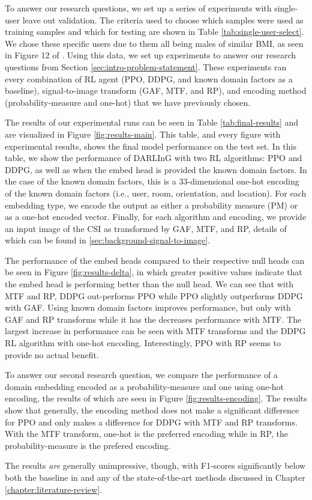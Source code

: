 To answer our research questions, we set up a series of experiments with single-user leave out validation.
The criteria used to choose which samples were used as training samples and which for testing are shown in Table \ref{tab:single-user-select}.
We chose these specific users due to them all being males of similar BMI, as seen in Figure 12 of \cite{zheng2019zero}.
Using this data, we set up experiments to answer our research questions from Section \ref{sec:intro-problem-statement}.
These experiments ran every combination of RL agent (PPO, DDPG, and known domain factors as a baseline), signal-to-image transform (GAF, MTF, and RP), and encoding method (probability-measure and one-hot) that we have previously chosen.

The results of our experimental runs can be seen in Table \ref{tab:final-results} and are visualized in Figure \ref{fig:results-main}.
This table, and every figure with experimental results, shows the final model performance on the test set.
In this table, we show the performance of DARLInG with two RL algorithms: PPO and DDPG, as well as when the embed head is provided the known domain factors.
In the case of the known domain factors, this is a 33-dimensional one-hot encoding of the known domain factors (i.e., user, room, orientation, and location).
For each embedding type, we encode the output as either a probability measure (PM) or as a one-hot encoded vector.
Finally, for each algorithm and encoding, we provide an input image of the CSI as transformed by GAF, MTF, and RP, details of which can be found in \ref{sec:background-signal-to-image}.

The performance of the embed heads compared to their respective null heads can be seen in Figure \ref{fig:results-delta}, in which greater positive values indicate that the embed head is performing better than the null head.
We can see that with MTF and RP, DDPG out-performs PPO while PPO slightly outperforms DDPG with GAF.
Using known domain factors improves performance, but only with GAF and RP transforms while it has the decreases performance with MTF.
The largest increase in performance can be seen with MTF transforms and the DDPG RL algorithm with one-hot encoding.
Interestingly, PPO with RP seems to provide no actual benefit.

To answer our second research question, we compare the performance of a domain embedding encoded as a probability-measure and one using one-hot encoding, the results of which are seen in Figure \ref{fig:results-encoding}.
The results show that generally, the encoding method does not make a significant difference for PPO and only makes a difference for DDPG with MTF and RP transforms.
With the MTF transform, one-hot is the preferred encoding while in RP, the probability-measure is the prefered encoding.


The results \textit{are} generally unimpressive, though, with F1-scores significantly below both the baseline in \cite{zheng2019zero} and any of the state-of-the-art methods discussed in Chapter \ref{chapter:literature-review}.





